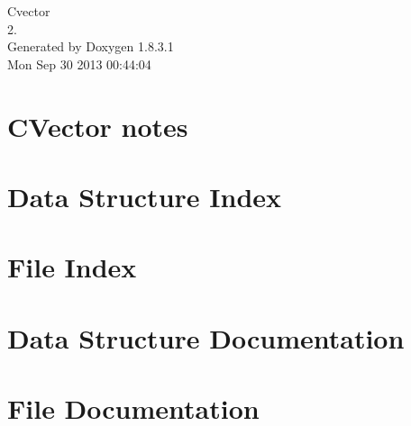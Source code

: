 \documentclass{book}
\begin{document}
\hypersetup{pageanchor=false,citecolor=blue}
\begin{titlepage}
\vspace*{7cm}
\begin{center}
{\Large Cvector \\[1ex]\large 2. }\\
\vspace*{1cm}
{\large Generated by Doxygen 1.8.3.1}\\
\vspace*{0.5cm}
{\small Mon Sep 30 2013 00:44:04}\\
\end{center}
\end{titlepage}
\clearemptydoublepage
{}
\tableofcontents
\clearemptydoublepage
{}
\hypersetup{pageanchor=true,citecolor=blue}
\chapter{C\-Vector notes}
\label{index}\hypertarget{index}{}
\chapter{Data Structure Index}

\chapter{File Index}

\chapter{Data Structure Documentation}









\chapter{File Documentation}






















\printindex
\end{document}
